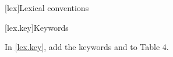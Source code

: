 
[lex]{Lexical conventions}

[lex.key]{Keywords}

In \ref{lex.key}, add the keywords  and
 to Table 4.

